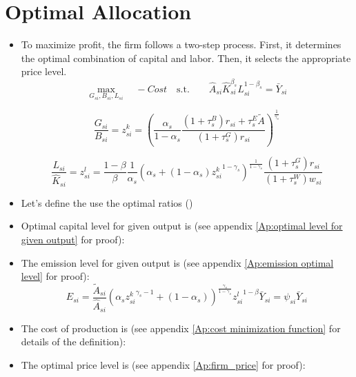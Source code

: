 \documentclass[12pt]{article} %
\begin{document}
\section*{Optimal Allocation}
\begin{itemize}
    \item To maximize profit, the firm follows a two-step process. First, it determines the optimal combination of capital and labor. Then, it selects the appropriate price level.
    \begin{equation*}
        \max_{{G_{si},B_{si},L_{si}}}  \quad
            - 		Cost \quad \text{s.t.} \quad \quad \hat{A}_{si}\hat{K}_{si}^{\beta_s} L_{si}^{1-\beta_s} = \bar{Y}_{si}
    \end{equation*}

    \begin{equation}
        {\frac{G_{si}}{B_{si}} = {z_{si}^k}} {=  \left(
            \frac{\alpha_s}{1-\alpha_s} \frac{(1+{\tau_s^B})r_{si} + {\tau_s^E}\tilde{A}}{(1+{\tau_s^G})r_{si}}
        \right) ^{\frac{1}{\gamma_s}}}
    \end{equation}

    \begin{equation}
        {\frac{L_{si}}{\hat{K}_{si}} = {z_{si}^l}}
        { = \frac{1-\beta}{\beta}\frac{1}{\alpha_s}\left(
            \alpha_s + (1-\alpha_s) {{z_{si}^k}}^{1-\gamma_s}
        \right)^{\frac{1}{1-\gamma_s}} \frac{(1+{\tau_s^G})r_{si}}{(1+{\tau_s^W})w_{si}}}
    \end{equation}
  

    \item Let's define the use the optimal ratios ()
    
    \item Optimal capital level for given output is (see appendix \ref{Ap:optimal level for given output} for proof):
    

    \item The emission level for given output is (see appendix \ref{Ap:emission optimal level} for proof):
    \begin{equation}
        {E_{si} = \frac{\tilde{A}_{si}}{\hat{A}_{si}}\left(
            \alpha_s {{z_{si}^k}}^{\gamma_s - 1} + (1-\alpha_s)
        \right) ^ {\frac{\gamma_s}{1-\gamma_s}} {{z_{si}^l}}^{1 - \beta} \bar{Y}_{si} }
        {= {\psi_{si}}\bar{Y}_{si}}
    \end{equation}
    
    \item The cost of production is (see appendix \ref{Ap:cost minimization function} for details of the definition):
    
    
    \item The optimal price level is (see appendix \ref{Ap:firm_price} for proof):
    

\end{itemize}
\end{document}
